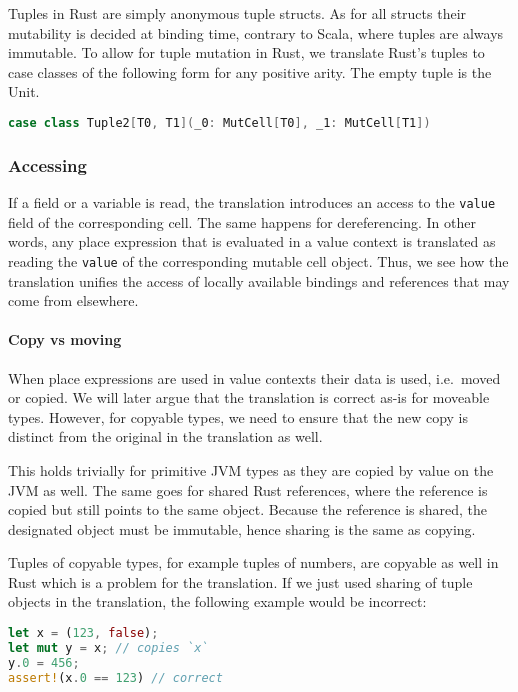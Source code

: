Tuples in Rust are simply anonymous tuple structs. As for all structs
their mutability is decided at binding time, contrary to Scala, where
tuples are always immutable. To allow for tuple mutation in Rust, we
translate Rust's tuples to case classes of the following form for any
positive arity. The empty tuple is the Unit.

\begin{lstlisting}[language=Scala, style=short]
case class Tuple2[T0, T1](_0: MutCell[T0], _1: MutCell[T1])
\end{lstlisting}

\subsubsection{Accessing}

If a field or a variable is read, the translation introduces an access
to the \passthrough{\lstinline!value!} field of the corresponding cell.
The same happens for dereferencing. In other words, any place expression
that is evaluated in a value context is translated as reading the
\passthrough{\lstinline!value!} of the corresponding mutable cell
object. Thus, we see how the translation unifies the access of locally
available bindings and references that may come from elsewhere.

\paragraph{Copy vs moving}

When place expressions are used in value contexts their data is used, i.e.~moved
or copied. We will later argue that the translation is correct as-is for
moveable types. However, for copyable types, we need to ensure that the new copy
is distinct from the original in the translation as well.

This holds trivially for primitive JVM types as they are copied by value
on the JVM as well. The same goes for shared Rust references, where the
reference is copied but still points to the same object. Because the
reference is shared, the designated object must be immutable, hence
sharing is the same as copying.

Tuples of copyable types, for example tuples of numbers, are copyable as
well in Rust which is a problem for the translation. If we just used
sharing of tuple objects in the translation, the following example would
be incorrect:

\begin{lstlisting}[language=Rust, caption=The tuple is copied on line 2.]
let x = (123, false);
let mut y = x; // copies `x`
y.0 = 456;
assert!(x.0 == 123) // correct
\end{lstlisting}

